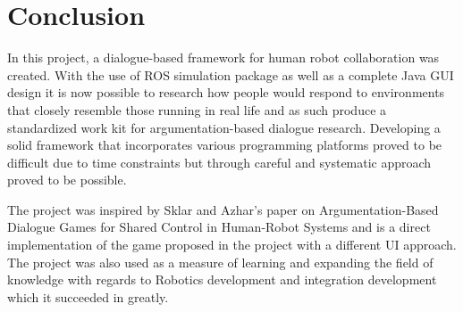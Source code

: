 \chapter{Conclusion}
In this project, a dialogue-based framework for human robot collaboration was created. With the use of ROS simulation package as well as a complete Java GUI design it is now possible to research how people would respond to environments that closely resemble those running in real life and as such produce a standardized work kit for argumentation-based dialogue research. Developing a solid framework that incorporates various programming platforms proved to be difficult due to time constraints but through careful and systematic approach proved to be possible.

The project was inspired by Sklar and Azhar's\cite{Elizabeth} paper on Argumentation-Based Dialogue Games for Shared Control in Human-Robot Systems and is a direct implementation of the game proposed in the project with a different UI approach. The project was also used as a measure of learning and expanding the field of knowledge with regards to Robotics development and integration development which it succeeded in greatly.